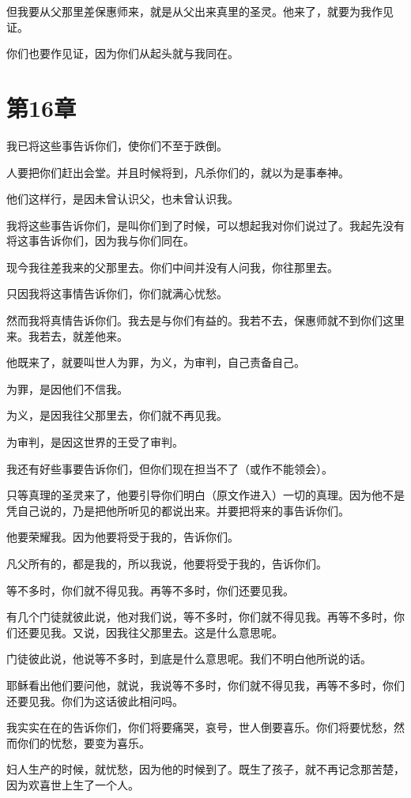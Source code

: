 \documentclass[12pt,oneside]{book}
\begin{document}
但我要从父那里差保惠师来，就是从父出来真里的圣灵。他来了，就要为我作见证。

你们也要作见证，因为你们从起头就与我同在。

\chapter{第16章}
我已将这些事告诉你们，使你们不至于跌倒。

人要把你们赶出会堂。并且时候将到，凡杀你们的，就以为是事奉神。

他们这样行，是因未曾认识父，也未曾认识我。

我将这些事告诉你们，是叫你们到了时候，可以想起我对你们说过了。我起先没有将这事告诉你们，因为我与你们同在。

现今我往差我来的父那里去。你们中间并没有人问我，你往那里去。

只因我将这事情告诉你们，你们就满心忧愁。

然而我将真情告诉你们。我去是与你们有益的。我若不去，保惠师就不到你们这里来。我若去，就差他来。

他既来了，就要叫世人为罪，为义，为审判，自己责备自己。

为罪，是因他们不信我。

为义，是因我往父那里去，你们就不再见我。

为审判，是因这世界的王受了审判。

我还有好些事要告诉你们，但你们现在担当不了（或作不能领会）。

只等真理的圣灵来了，他要引导你们明白（原文作进入）一切的真理。因为他不是凭自己说的，乃是把他所听见的都说出来。并要把将来的事告诉你们。

他要荣耀我。因为他要将受于我的，告诉你们。

凡父所有的，都是我的，所以我说，他要将受于我的，告诉你们。

等不多时，你们就不得见我。再等不多时，你们还要见我。

有几个门徒就彼此说，他对我们说，等不多时，你们就不得见我。再等不多时，你们还要见我。又说，因我往父那里去。这是什么意思呢。

门徒彼此说，他说等不多时，到底是什么意思呢。我们不明白他所说的话。

耶稣看出他们要问他，就说，我说等不多时，你们就不得见我，再等不多时，你们还要见我。你们为这话彼此相问吗。

我实实在在的告诉你们，你们将要痛哭，哀号，世人倒要喜乐。你们将要忧愁，然而你们的忧愁，要变为喜乐。

妇人生产的时候，就忧愁，因为他的时候到了。既生了孩子，就不再记念那苦楚，因为欢喜世上生了一个人。
\end{document}
